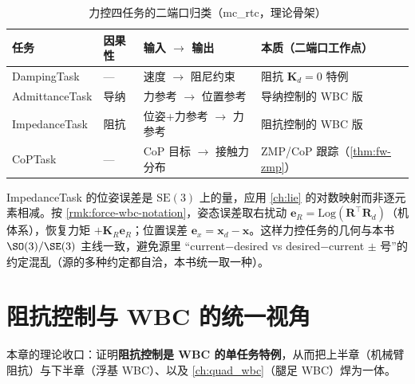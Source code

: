 \begin{table}[H]\centering\small
\caption{力控四任务的二端口归类（mc\_rtc，理论骨架）}
\label{tab:fw-fourtask}
\begin{tabular}{llll}
\toprule
任务 & 因果性 & 输入 $\to$ 输出 & 本质（二端口工作点） \\
\midrule
DampingTask & — & 速度 $\to$ 阻尼约束 & 阻抗 $\mathbf{K}_d=0$ 特例 \\
AdmittanceTask & 导纳 & 力参考 $\to$ 位置参考 & 导纳控制的 WBC 版 \\
ImpedanceTask & 阻抗 & 位姿+力参考 $\to$ 力参考 & 阻抗控制的 WBC 版 \\
CoPTask & — & CoP 目标 $\to$ 接触力分布 & ZMP/CoP 跟踪（\cref{thm:fw-zmp}） \\
\bottomrule
\end{tabular}
\end{table}

\begin{remark}[SE(3) 阻抗误差用本书右扰动对数映射]
\label{rmk:fw-se3-error}
ImpedanceTask 的位姿误差是 $\mathrm{SE}(3)$ 上的量，应用 \cref{ch:lie} 的对数映射而非逐元素相减。按 \cref{rmk:force-wbc-notation}，姿态误差取右扰动 $\mathbf{e}_R=\mathrm{Log}(\mathbf{R}^\top\mathbf{R}_d)$（机体系），恢复力矩 $+\mathbf{K}_R\mathbf{e}_R$；位置误差 $\mathbf{e}_x=\mathbf{x}_d-\mathbf{x}$。这样力控任务的几何与本书 $\SO(3)/\SE(3)$ 主线一致，避免源里 “current$-$desired vs desired$-$current $\pm$ 号”的约定混乱（源的多种约定都自洽，本书统一取一种）。
\end{remark}

\section{阻抗控制与 WBC 的统一视角}
\label{sec:fw-unification}

本章的理论收口：证明\textbf{阻抗控制是 WBC 的单任务特例}，从而把上半章（机械臂阻抗）与下半章（浮基 WBC）、以及 \cref{ch:quad_wbc}（腿足 WBC）焊为一体。

